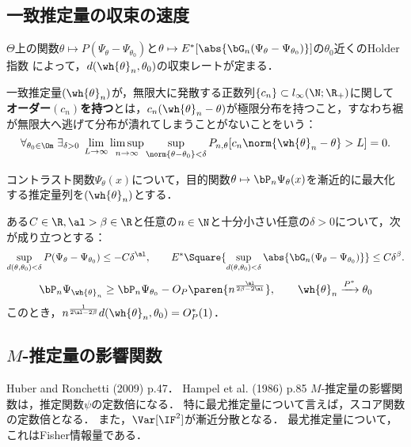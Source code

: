 \documentclass[uplatex,dvipdfmx]{jsreport}
\begin{document}
\subsection{一致推定量の収束の速度}

\begin{tcolorbox}[colframe=ForestGreen, colback=ForestGreen!10!white,breakable,colbacktitle=ForestGreen!40!white,coltitle=black,fonttitle=\bfseries\sffamily,
    title=]
    $\Theta$上の関数$\theta\mapsto P(\Psi_\theta-\Psi_{\theta_0})$と$\theta\mapsto E^*[\abs{\bG_n(\Psi_\theta-\Psi_{\theta_0})}]$の$\theta_0$近くのHolder指数
    によって，$d(\wh{\theta}_n,\theta_0)$の収束レートが定まる．
\end{tcolorbox}
    
\begin{definition}
    一致推定量$(\wh{\theta}_n)$が，無限大に発散する正数列$\{c_n\}\subset l_\infty(\N;\R_+)$に関して
    \textbf{オーダー$(c_n)$を持つ}とは，$c_n(\wh{\theta}_n-\theta)$が極限分布を持つこと，すなわち裾が無限大へ逃げて分布が潰れてしまうことがないことをいう：
    \[\forall_{\theta_0\in\Om}\;\exists_{\delta>0}\;\lim_{L\to\infty}\limsup_{n\to\infty}\sup_{\norm{\theta-\theta_0}<\delta}P_{n,\theta}[c_n\norm{\wh{\theta}_n-\theta}>L]=0.\]
\end{definition}

\begin{notation}
    コントラスト関数$\Psi_\theta(x)$について，目的関数$\theta\mapsto\bP_n\Psi_\theta(x)$を漸近的に最大化する推定量列を$(\wh{\theta}_n)$とする．
\end{notation}

\begin{theorem}
    ある$C\in\R,\al>\beta\in\R$と任意の$n\in\N$と十分小さい任意の$\delta>0$について，次が成り立つとする：
    \[\sup_{d(\theta,\theta_0)<\delta}P(\Psi_\theta-\Psi_{\theta_0})\le-C\delta^\al,\qquad E^*\Square{\sup_{d(\theta,\theta_0)<\delta}\abs{\bG_n(\Psi_\theta-\Psi_{\theta_0})}}\le C\delta^\beta.\]
    \[\bP_n\Psi_{\wh{\theta}_n}\ge\bP_n\Psi_{\theta_0}-O_P\paren{n^{\frac{\al}{2\beta-2\al}}},\qquad\wh{\theta}_n\xrightarrow{P^*}\theta_0\]
    このとき，$n^{\frac{1}{2\al-2\beta}}d(\wh{\theta}_n,\theta_0)=O^*_P(1)$．
\end{theorem}

\subsection{$M$-推定量の影響関数}

\begin{tcolorbox}[colframe=ForestGreen, colback=ForestGreen!10!white,breakable,colbacktitle=ForestGreen!40!white,coltitle=black,fonttitle=\bfseries\sffamily,
title=]
    Huber and Ronchetti (2009)\cite{Huber} p.47．
    Hampel et al. (1986) p.85\cite{Hampel}
    $M$-推定量の影響関数は，推定関数$\psi$の定数倍になる．
    特に最尤推定量について言えば，スコア関数の定数倍となる．
    また，$\Var[\IF^2]$が漸近分散となる．
    最尤推定量について，これはFisher情報量である．
\end{tcolorbox}
\end{document}
